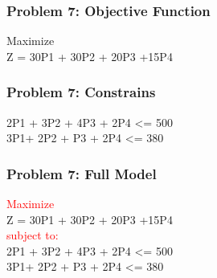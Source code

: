 \documentclass[10pt,svgnames,fragile]{beamer}
\begin{document}


\begin{frame}[label={sec:orge9abdcb}]{}

\frametitle{Problem 7: Objective Function }
Maximize\\[1em]

Z = 30P1 + 30P2 + 20P3 +15P4



\end{frame}

\begin{frame}[label={sec:orge9abdcb}]{}
\frametitle{Problem 7: Constrains }


2P1 + 3P2 + 4P3 + 2P4 <= 500\\[1em]
3P1+ 2P2 + P3 + 2P4 <= 380


\end{frame}

\begin{frame}[label={sec:orge9abdcb}]{}
\frametitle{Problem 7: Full Model }
\textcolor{red}{Maximize}\\[1em]
Z = 30P1 + 30P2 + 20P3 +15P4\\[1em]
\textcolor{red}{subject to:}\\[1em]
2P1 + 3P2 + 4P3 + 2P4 <= 500\\
3P1+ 2P2 + P3 + 2P4 <= 380
\end{frame}
\end{document}
